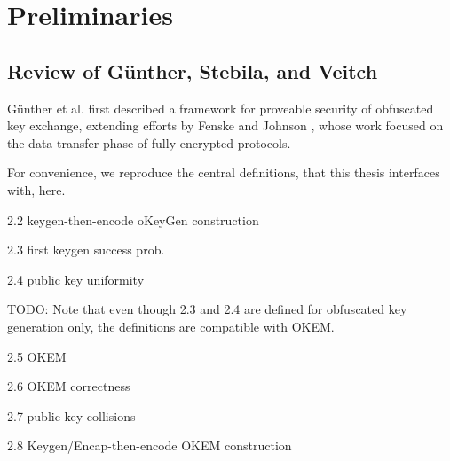 \chapter{Preliminaries}\label{ch:preliminaries}

\section{\texorpdfstring{Review of Günther, Stebila, and Veitch \cite{CCS:GunSteVei24}}{Review of Günther, Stebila, and Veitch}} \label{sec:review-gsv24}

Günther et al. first described a framework for proveable security of obfuscated key exchange, extending efforts by Fenske and Johnson \cite{CCS:FenJoh24}, whose work focused on the data transfer phase of fully encrypted protocols.

For convenience, we reproduce the central definitions, that this thesis interfaces with, here.

\begin{definition}\label{def:keygen-then-encode}
    2.2 keygen-then-encode oKeyGen construction
\end{definition}

\begin{definition}\label{def:first-keygen-success}
    2.3 first keygen success prob.
\end{definition}

\begin{definition}\label{def:pk-uniformity}
    2.4 public key uniformity
\end{definition}

TODO: Note that even though 2.3 and 2.4 are defined for obfuscated key generation only, the definitions are compatible with OKEM.

\begin{definition}\label{def:okem}
    2.5 OKEM
\end{definition}

\begin{definition}\label{def:okem-correctness}
    2.6 OKEM correctness
\end{definition}

\begin{definition}\label{def:pk-collisions}
    2.7 public key collisions
\end{definition}

\begin{definition}\label{def:keygen-encap-then-encode}
    2.8 Keygen/Encap-then-encode OKEM construction
\end{definition}

